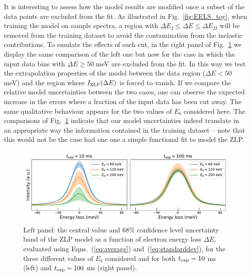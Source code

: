 It is interesting to assess how the model results are modified once a subset of the data points
are excluded from the fit.
%
As illustrated in Fig.~\ref{fig:EELS_toy}, when training the model on sample spectra, a region
with $\Delta E_I \le \Delta E \le \Delta E_{II}$ will be removed from the training dataset to avoid the
contamination from the inelastic contributions.
%
To emulate the effects of such cut, in the right panel of Fig.~\ref{fig:EELS_vacuum_DeltaE} we
display the same comparison of the left one but now
for the case in which the input data bins with $\Delta E \ge 50$ meV are excluded from the fit.
%
In this way we test the extrapolation properties of the model between the data region ($\Delta E < 50$ meV)
and the region where $I_{\rm ZLP}(\Delta E)$ is forced to vanish.
%
If we compare the relative model uncertainties between the two cases, one can observe the expected
increase in the errors where a fraction of the input data has been cut away.
%
The same qualitative behaviour appears for the two values of $E_b$ considered here.
%
The comparisons of Fig.~\ref{fig:EELS_vacuum_DeltaE} indicate that our model uncertainties
indeed translate in an appropriate way the information contained in the training dataset -- note that
this would not be the case had one one a simple functional fit to model the ZLP.

\begin{figure}[t]
    \centering
    \includegraphics[width=170mm]{plots/deltaE_dependence_vacuum.pdf}
    \caption{Left panel: the central value and 68\% confidence level uncertainty band of the ZLP model as a function
      of electron energy loss $\Delta E$,
      evaluated using Eqns.~(\ref{eq:average}) and~(\ref{eq:standarddev}), for
      the three different values of $E_b$ considered and for both
      $t_{\rm exp}=10$ ms (left)  and $t_{\rm exp}=100$ ms (right panel).
      \label{fig:EELS_vacuum_DeltaE}}
\end{figure}

